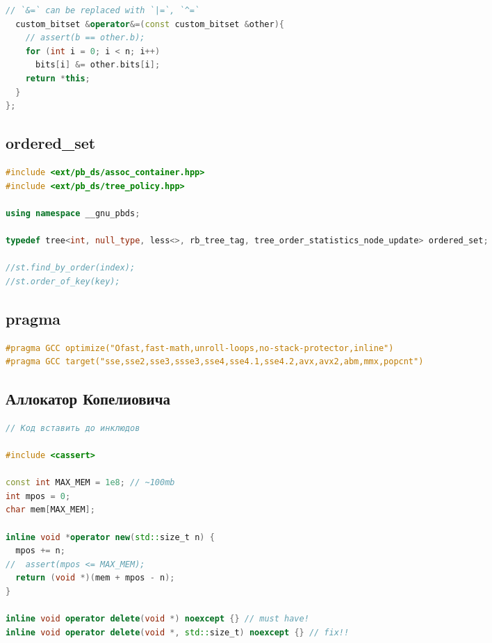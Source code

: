 \documentclass[9pt,a4paper,landscape,twosided]{extarticle}
\begin{document}
\begin{multicols*}{3}
\begin{lstlisting}[language=C++]
  // `&=` can be replaced with `|=`, `^=`
  custom_bitset &operator&=(const custom_bitset &other){
    // assert(b == other.b);
    for (int i = 0; i < n; i++)
      bits[i] &= other.bits[i];
    return *this;
  }
};
\end{lstlisting}

\subsection{ordered\_set}
\begin{lstlisting}[language=C++]
#include <ext/pb_ds/assoc_container.hpp>
#include <ext/pb_ds/tree_policy.hpp>

using namespace __gnu_pbds;

typedef tree<int, null_type, less<>, rb_tree_tag, tree_order_statistics_node_update> ordered_set;

//st.find_by_order(index);
//st.order_of_key(key);

\end{lstlisting}

\subsection{pragma}
\begin{lstlisting}[language=C++]
#pragma GCC optimize("Ofast,fast-math,unroll-loops,no-stack-protector,inline")
#pragma GCC target("sse,sse2,sse3,ssse3,sse4,sse4.1,sse4.2,avx,avx2,abm,mmx,popcnt")

\end{lstlisting}

\subsection{Аллокатор Копелиовича}
\begin{lstlisting}[language=C++]
// Код вставить до инклюдов

#include <cassert>

const int MAX_MEM = 1e8; // ~100mb
int mpos = 0;
char mem[MAX_MEM];

inline void *operator new(std::size_t n) {
  mpos += n;
//  assert(mpos <= MAX_MEM);
  return (void *)(mem + mpos - n);
}

inline void operator delete(void *) noexcept {} // must have!
inline void operator delete(void *, std::size_t) noexcept {} // fix!!
\end{lstlisting}


\end{multicols*}
\end{document}
